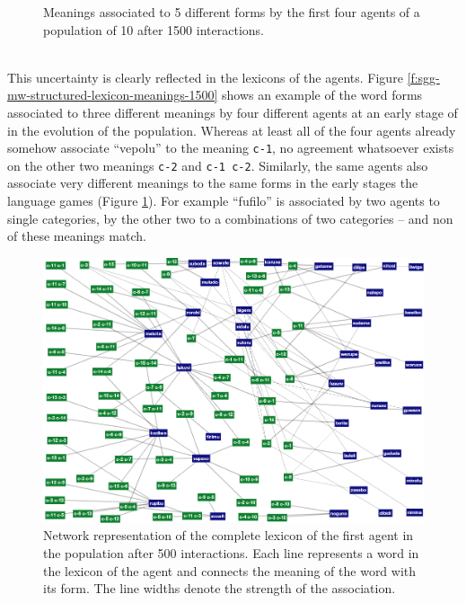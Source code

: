 \begin{figure}[t]
  
  \caption{Meanings associated to 5 different forms by the first four
    agents of a population of 10 after 1500 interactions.}
  \label{f:sgg-mw-structured-lexicon-forms-1500}
\end{figure}

\stopfiguregroup

~\\


\noindent This uncertainty is clearly reflected in the lexicons of the
agents. Figure \ref{f:sgg-mw-structured-lexicon-meanings-1500} shows
an example of the word forms associated to three different meanings by
four different agents at an early stage of in the evolution of the
population. Whereas at least all of the four agents already somehow
associate ``vepolu'' to the meaning \texttt{c-1}, no agreement
whatsoever exists on the other two meanings \texttt{c-2} and
\texttt{c-1 c-2}. Similarly, the same agents also associate very
different meanings to the same forms in the early stages the language
games (Figure \ref{f:sgg-mw-structured-lexicon-forms-1500}). For
example ``fufilo'' is associated by two agents to single categories,
by the other two to a combinations of two categories -- and non of
these meanings match.

\begin{figure}[t]
  \includegraphics[width=\textwidth]{figures/sgg-mw-structured-lexicon-500}
  \caption{Network representation of the complete lexicon of the first
    agent in the population after 500 interactions. Each line
    represents a word in the lexicon of the agent and connects the
    meaning of the word with its form. The line widths denote the
    strength of the association. }
  \label{f:sgg-mw-structured-lexicon-500}
\end{figure}

